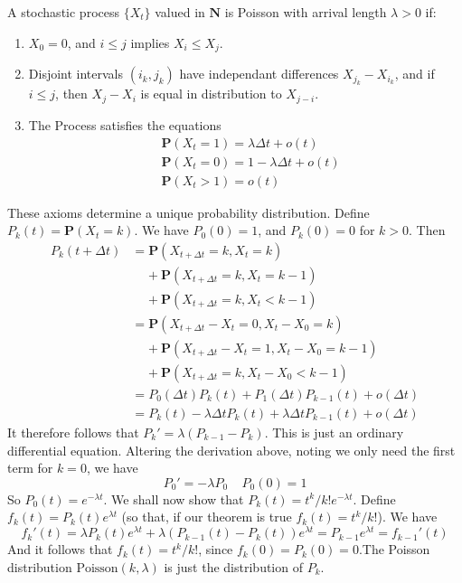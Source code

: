 \begin{definition}
    A stochastic process $\{ X_t \}$ valued in $\mathbf{N}$ is Poisson with arrival length $\lambda > 0$ if:
    \begin{enumerate}
        \item $X_0 = 0$, and $i \leq j$ implies $X_i \leq X_j$.
        \item Disjoint intervals $(i_k, j_k)$ have independant differences $X_{j_k} - X_{i_k}$, and if $i \leq j$, then $X_j - X_i$ is equal in distribution to $X_{j-i}$.
        \item The Process satisfies the equations
        \begin{align}
            &\label{posson1} \mathbf{P}(X_t = 1) = \lambda \Delta t + o(t)\\
            &\label{poisson2} \mathbf{P}(X_t = 0) = 1 - \lambda \Delta t + o(t)\\
            &\label{poisson3} \mathbf{P}(X_t > 1) = o(t)
        \end{align}
    \end{enumerate}
\end{definition}

These axioms determine a unique probability distribution. Define $P_k(t) = \mathbf{P}(X_t = k)$. We have $P_0(0) = 1$, and $P_k(0) = 0$ for $k > 0$. Then
%
\begin{align*}
    P_k(t + \Delta t) &= \mathbf{P}(X_{t + \Delta t} = k, X_t = k)\\
    &\ \ \ \ \ + \mathbf{P}(X_{t + \Delta t} = k, X_t = k - 1)\\
    &\ \ \ \ \ + \mathbf{P}(X_{t + \Delta t} = k, X_t < k - 1)\\
    &= \mathbf{P}(X_{t + \Delta t} - X_t = 0, X_t - X_0 = k)\\
    &\ \ \ \ \ + \mathbf{P}(X_{t + \Delta t} - X_t = 1, X_t - X_0 = k-1)\\
    &\ \ \ \ \ + \mathbf{P}(X_{t + \Delta t} = k, X_t - X_0 < k - 1)\\
    &= P_0(\Delta t) P_k(t) + P_1(\Delta t) P_{k-1}(t) + o(\Delta t)\\
    &= P_k(t) - \lambda \Delta t P_k(t) + \lambda \Delta t P_{k-1}(t) + o(\Delta t)
\end{align*}
%
It therefore follows that $P_k' = \lambda(P_{k-1} - P_k)$. This is just an ordinary differential equation. Altering the derivation above, noting we only need the first term for $k = 0$, we have
%
\[ P_0' = - \lambda P_0\ \ \ \ \ P_0(0) = 1 \]
%
So $P_0(t) = e^{-\lambda t}$. We shall now show that $P_k(t) = t^k/k! e^{-\lambda t}$. Define $f_k(t) = P_k(t) e^{\lambda t}$ (so that, if our theorem is true $f_k(t) = t^k/k!$). We have
%
\[ f_k'(t) = \lambda P_k(t) e^{\lambda t} + \lambda (P_{k - 1}(t) - P_k(t)) e^{\lambda t} = P_{k - 1} e^{\lambda t} = f_{k - 1}'(t) \]
%
And it follows that $f_k(t) = t^k/k!$, since $f_k(0) = P_k(0) = 0$.The Poisson distribution $\text{Poisson}(k,\lambda)$ is just the distribution of $P_k$.

